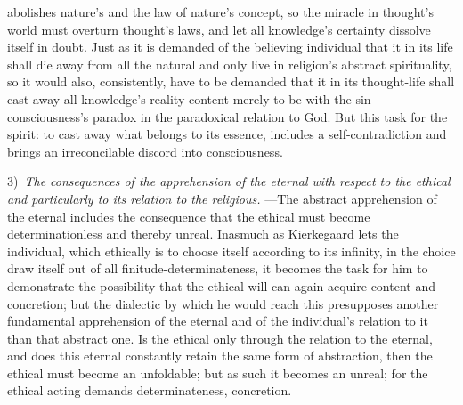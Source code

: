 \documentclass[12pt,a4paper]{book}
\begin{document}
abolishes nature's and the law of nature's concept, so the miracle in thought's world must overturn thought's
laws, and let all knowledge's certainty dissolve itself in doubt. Just as it is demanded of the believing
individual that it in its life shall die away from all the natural and only live in religion's abstract
spirituality, so it would also, consistently, have to be demanded that it in its thought-life shall cast away
all knowledge's reality-content merely to be with the sin-consciousness's paradox in the paradoxical relation
to God. But this task for the spirit: to cast away what belongs to its essence, includes a self-contradiction
and brings an irreconcilable discord into consciousness.

3)~\emph{The consequences of the apprehension of the eternal with respect to the ethical and particularly to
its relation to the religious.} ---The abstract apprehension of the eternal includes the consequence that the
ethical must become determinationless and thereby unreal. Inasmuch as Kierkegaard lets the individual, which
ethically is to choose itself according to its infinity, in the choice draw itself out of all
finitude-determinateness, it becomes the task for him to demonstrate the possibility that the ethical will can
again acquire content and concretion; but the dialectic by which he would reach this presupposes another
fundamental apprehension of the eternal and of the individual's relation to it than that abstract one. Is the
ethical only through the relation to the eternal, and does this eternal constantly retain the same form of
abstraction, then the ethical must become an unfoldable; but as such it becomes an unreal; for the ethical
acting demands determinateness, concretion.
\end{document}
